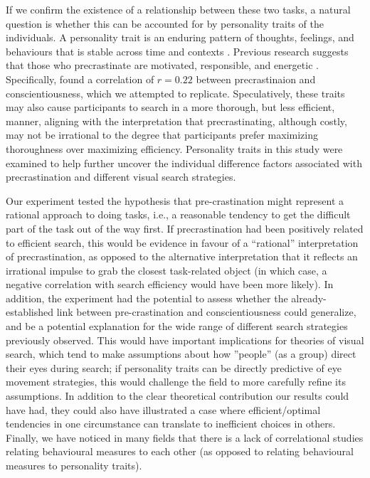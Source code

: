 \documentclass[]{rsos}
\begin{document}
If we confirm the existence of a relationship between these two tasks, a natural question is whether this can be accounted for by personality traits of the individuals.  A personality trait is an enduring pattern of thoughts, feelings, and behaviours that is stable across time and contexts \cite{funder2016}. Previous research suggests that those who precrastinate are motivated, responsible, and energetic \cite{rosenbaum2019}. Specifically, \cite{sauerberger2019} found a correlation of $r = 0.22$ between precrastinaion and conscientiousness, which we attempted to replicate. Speculatively, these traits may also cause participants to search in a more thorough, but less efficient, manner, aligning with the interpretation that precrastinating, although costly, may not be irrational to the degree that participants prefer maximizing thoroughness over maximizing efficiency. Personality traits in this study were examined to help further uncover the individual difference factors associated with precrastination and different visual search strategies. 

Our experiment tested the hypothesis that pre-crastination might represent a rational approach to doing tasks, i.e., a reasonable tendency to get the difficult part of the task out of the way first. If precrastination had been positively related to efficient search, this would be evidence in favour of a ``rational'' interpretation of precrastination, as opposed to the alternative interpretation that it reflects an irrational impulse to grab the closest task-related object (in which case, a negative correlation with search efficiency would have been more likely). In addition, the experiment had the potential to assess whether the already-established link between pre-crastination and conscientiousness could generalize, and be a potential explanation for the wide range of different search strategies previously observed. This would have important implications for theories of visual search, which tend to make assumptions about how ''people'' (as a group) direct their eyes during search; if personality traits can be directly predictive of eye movement strategies, this would challenge the field to more carefully refine its assumptions. In addition to the clear theoretical contribution our results could have had, they could also have illustrated a case where efficient/optimal tendencies in one circumstance can translate to inefficient choices in others. Finally, we have noticed in many fields that there is a lack of correlational studies relating behavioural measures to each other (as opposed to relating behavioural measures to personality traits).
\end{document}
